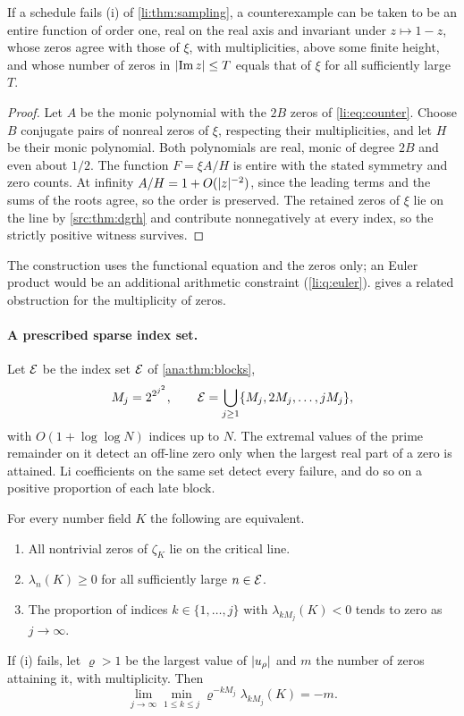 \begin{corollary}\label{li:cor:xi}
If a schedule fails \textup{(i)} of \cref{li:thm:sampling}, a counterexample can be taken to be
an entire function of order one, real on the real axis and invariant under $z\mapsto1-z$,
whose zeros agree with those of $\xi$, with multiplicities, above some finite height, and whose
number of zeros in $\lvert\operatorname{Im} z\rvert\le T$ equals that of $\xi$ for all sufficiently large $T$.
\end{corollary}

\begin{proof}
Let $A$ be the monic polynomial with the $2B$ zeros of \eqref{li:eq:counter}. Choose $B$
conjugate pairs of nonreal zeros of $\xi$, respecting their multiplicities, and let $H$ be
their monic polynomial. Both polynomials are real, monic of degree $2B$ and even about $1/2$.
The function $F=\xi A/H$ is entire with the stated symmetry and zero counts. At infinity
$A/H=1+O(\lvert z\rvert^{-2})$, since the leading terms and the sums of the roots agree, so the order is
preserved. The retained zeros of $\xi$ lie on the line by \cref{src:thm:dgrh} and contribute
nonnegatively at every index, so the strictly positive witness survives.
\end{proof}

The construction uses the functional equation and the zeros only; an Euler product would be
an additional arithmetic constraint (\cref{li:q:euler}).  gives a
related obstruction for the multiplicity of zeros.

\paragraph{A prescribed sparse index set.} Let $\mathcal{E}$ be the index set $\mathcal{E}$ of
\cref{ana:thm:blocks},
\begin{equation}\label{li:eq:E}
 M_j=2^{2^{j^2}},\qquad\mathcal{E}=\bigcup_{j\ge1}\{M_j,2M_j,\dots,jM_j\},
\end{equation}
with $O(1+\log\log N)$ indices up to $N$. The extremal values of the prime remainder on it
detect an off-line zero only when the largest real part of a zero is attained. Li coefficients on the same set detect
every failure, and do so on a positive proportion of each late block.

\begin{theorem}\label{li:thm:sparse}
For every number field $K$ the following are equivalent.
\begin{enumerate}[label=\textup{(\roman*)}]
\item All nontrivial zeros of $\zeta_K$ lie on the critical line.
\item $\lambda_n(K)\ge0$ for all sufficiently large $n\in\mathcal{E}$.
\item The proportion of indices $k\in\{1,\dots,j\}$ with $\lambda_{kM_j}(K)<0$ tends to zero as
 $j\to\infty$.
\end{enumerate}
If \textup{(i)} fails, let $\varrho>1$ be the largest value of $\lvert u_\rho\rvert$ and $m$ the number
of zeros attaining it, with multiplicity. Then
\[
 \lim_{j\to\infty}\min_{1\le k\le j}\varrho^{-kM_j}\lambda_{kM_j}(K)=-m .
\]
\end{theorem}

